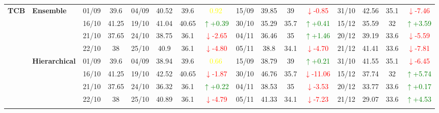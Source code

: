 \documentclass{ieeeaccess}
\begin{document}
{\begin{longtable}{llcc|cccc|cccc|cccc}
\multirow{12}{*}{\textbf{TCB}} 
& \textbf{Ensemble}
& 01/09 & 39.6 & 04/09 & 40.52 & 39.6 & \textcolor{yellow}{0.92} & 15/09 & 39.85 & 39 & \textcolor{red}{\(\downarrow\)-0.85} & 31/10 & 42.56 & 35.1 & \textcolor{red}{\(\downarrow\)-7.46} \\

&
& 16/10 & 41.25 & 19/10 & 41.04 & 40.65 & \textcolor{green}{\(\uparrow\)+0.39} & 30/10 & 35.29 & 35.7 & \textcolor{green}{\(\uparrow\)+0.41} & 15/12 & 35.59 & 32 & \textcolor{green}{\(\uparrow\)+3.59} \\

&
& 21/10 & 37.65 & 24/10 & 38.75 & 36.1 & \textcolor{red}{\(\downarrow\)-2.65} & 04/11 & 36.46 & 35 & \textcolor{green}{\(\uparrow\)+1.46} & 20/12 & 39.19 & 33.6 & \textcolor{red}{\(\downarrow\)-5.59} \\

&
& 22/10 & 38 & 25/10 & 40.9 & 36.1 & \textcolor{red}{\(\downarrow\)-4.80} & 05/11 & 38.8 & 34.1 & \textcolor{red}{\(\downarrow\)-4.70} & 21/12 & 41.41 & 33.6 & \textcolor{red}{\(\downarrow\)-7.81} \\
\cmidrule(lr){2-16}


& \textbf{Hierarchical}
& 01/09 & 39.6 & 04/09 & 38.94 & 39.6 & \textcolor{yellow}{0.66} & 15/09 & 38.79 & 39 & \textcolor{green}{\(\uparrow\)+0.21} & 31/10 & 41.55 & 35.1 & \textcolor{red}{\(\downarrow\)-6.45} \\

&
& 16/10 & 41.25 & 19/10 & 42.52 & 40.65 & \textcolor{red}{\(\downarrow\)-1.87} & 30/10 & 46.76 & 35.7 & \textcolor{red}{\(\downarrow\)-11.06} & 15/12 & 37.74 & 32 & \textcolor{green}{\(\uparrow\)+5.74} \\

&
& 21/10 & 37.65 & 24/10 & 36.32 & 36.1 & \textcolor{green}{\(\uparrow\)+0.22} & 04/11 & 38.53 & 35 & \textcolor{red}{\(\downarrow\)-3.53} & 20/12 & 33.77 & 33.6 & \textcolor{green}{\(\uparrow\)+0.17} \\

&
& 22/10 & 38 & 25/10 & 40.89 & 36.1 & \textcolor{red}{\(\downarrow\)-4.79} & 05/11 & 41.33 & 34.1 & \textcolor{red}{\(\downarrow\)-7.23} & 21/12 & 29.07 & 33.6 & \textcolor{green}{\(\uparrow\)+4.53} \\
\cmidrule(lr){2-16}




\end{longtable}}
\end{document}
